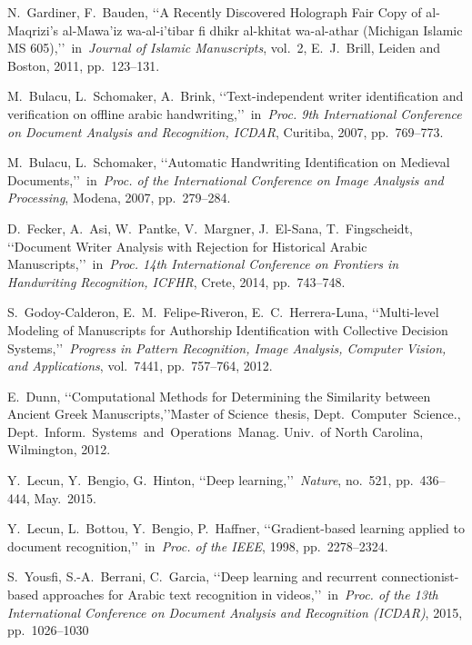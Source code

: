 \documentclass[conference,a4paper]{ieeetran}
\begin{document}
 \begin{thebibliography}{99}

 N.~Gardiner, F.~Bauden, \lq\lq A Recently Discovered Holograph Fair Copy of al-Maqrizi's al-Mawa'iz wa-al-i'tibar fi dhikr al-khitat wa-al-athar (Michigan Islamic MS 605),\rq\rq~in~\emph{Journal of Islamic Manuscripts}, vol.~2, E.~J.~Brill, Leiden and Boston, 2011, pp.~123--131.

 M.~Bulacu, L.~Schomaker, A.~Brink, \lq\lq Text-independent writer identification and verification on offline arabic handwriting,\rq\rq~in~\emph{Proc. 9th International Conference on Document Analysis and Recognition, ICDAR}, Curitiba, 2007, pp.~769--773.

 M.~Bulacu, L.~Schomaker, \lq\lq Automatic Handwriting Identification on Medieval Documents,\rq\rq~in~\emph{Proc. of the International Conference on Image Analysis and Processing}, Modena, 2007, pp.~279--284.

 D.~Fecker, A.~Asi, W.~Pantke, V.~Margner, J.~El-Sana, T.~Fingscheidt, \lq\lq Document Writer Analysis with Rejection for Historical Arabic Manuscripts,\rq\rq~in~\emph{Proc. 14th International Conference on Frontiers in Handwriting Recognition, ICFHR}, Crete, 2014, pp.~743--748.

 S.~Godoy-Calderon, E.~M.~Felipe-Riveron, E.~C.~Herrera-Luna, \lq\lq Multi-level Modeling of Manuscripts for Authorship Identification with Collective Decision Systems,\rq\rq~\emph{Progress in Pattern Recognition, Image Analysis, Computer Vision, and Applications}, vol.~7441, pp.~757--764, 2012.

 E.~Dunn, \lq\lq Computational Methods for Determining the Similarity between Ancient Greek Manuscripts,\rq\rq Master of Science~thesis, Dept.~Computer~Science., Dept.~Inform.~Systems~and~Operations~Manag. Univ.~of North Carolina, Wilmington, 2012.

 Y.~Lecun, Y.~Bengio, G.~Hinton, \lq\lq Deep learning,\rq\rq~\emph{Nature}, no.~521, pp.~436--444, May.~2015.

 Y.~Lecun, L.~Bottou, Y.~Bengio, P.~Haffner, \lq\lq Gradient-based learning applied to document recognition,\rq\rq~in~\emph{Proc. of the IEEE}, 1998, pp.~2278--2324.

 S.~Yousfi, S.-A.~Berrani, C.~Garcia, \lq\lq Deep learning and recurrent connectionist-based approaches for Arabic text recognition in videos,\rq\rq~in~\emph{Proc. of the 13th International Conference on Document Analysis and Recognition (ICDAR)}, 2015, pp.~1026--1030


\end{thebibliography}
\end{document}
